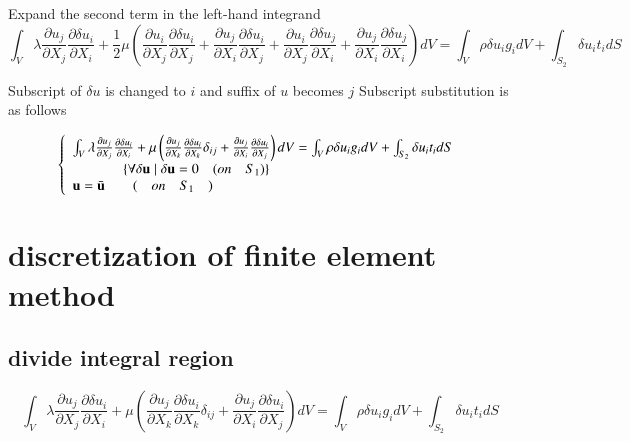 Expand the second term in the left-hand integrand
\begin{equation}
\int_V \lambda\frac{\partial u_j}{\partial X_j}\frac{\partial \delta u_i}{\partial X_i}+\frac{1}{2}\mu\left(\frac{\partial u_i}{\partial X_j}\frac{\partial \delta u_i}{\partial X_j} + \frac{\partial u_j}{\partial X_i}\frac{\partial \delta u_i}{\partial X_j} + \frac{\partial u_i}{\partial X_j}\frac{\partial \delta u_j}{\partial X_i} + \frac{\partial u_j}{\partial X_i}\frac{\partial \delta u_j}{\partial X_i}\right)dV=\int_V\rho\delta u_i g_idV+\int_{S_2}\delta u_i t_idS
\end{equation}

Subscript of $\delta u$ is changed to $i$ and suffix of $u$ becomes $j$ Subscript substitution is as follows

\begin{tcolorbox}[title=Governing equations weakly formulated based on displacement]
\begin{eqnarray}
\left\{\begin{array}{l}\int_V \lambda\frac{\partial u_j}{\partial X_j}\frac{\partial \delta u_i}{\partial X_i} + \mu\left(\frac{\partial u_j}{\partial X_k}\frac{\partial \delta u_i}{\partial X_k}\delta_{ij} + \frac{\partial u_j}{\partial X_i}\frac{\partial \delta u_i}{\partial X_j} \right)dV=\int_V\rho\delta u_i g_idV+\int_{S_2}\delta u_i t_idS\\
\;\;\;\;\;\;\;\;\;\;\;\;\;\left\{\forall\delta\mathbf{u} \mid \delta\mathbf{u}=0 \quad (on \quad S_1) \right\}\\
\mathbf{u}=\bar{\mathbf{u}}\qquad (\quad on \quad S_1 \quad)\end{array}\right.
\end{eqnarray}
\end{tcolorbox}


\section{discretization of finite element method}


\subsection{divide integral region}

\begin{equation}
\int_V \lambda\frac{\partial u_j}{\partial X_j}\frac{\partial \delta u_i}{\partial X_i} + \mu\left(\frac{\partial u_j}{\partial X_k}\frac{\partial \delta u_i}{\partial X_k}\delta_{ij} + \frac{\partial u_j}{\partial X_i}\frac{\partial \delta u_i}{\partial X_j} \right)dV=\int_V\rho\delta u_i g_idV+\int_{S_2}\delta u_i t_idS
\end{equation}



